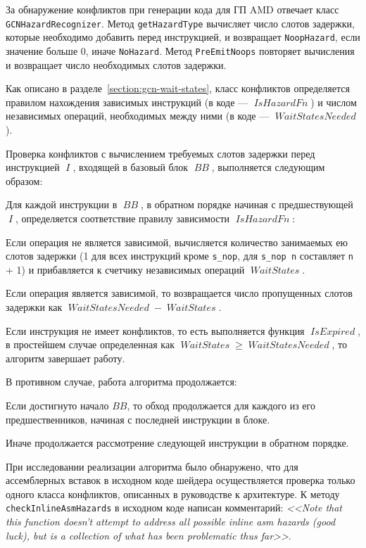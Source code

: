 \documentclass[a4paper,14pt]{extarticle}
\newcommand{\var}[1]{\mathop{\mathit{#1}}}
\begin{document}
{За обнаружение конфликтов при генерации кода для ГП AMD отвечает класс \verb|GCNHazardRecognizer|.
Метод \verb|getHazardType| вычисляет число слотов задержки, которые необходимо добавить
перед инструкцией, и возвращает \verb|NoopHazard|, если значение больше 0, иначе \verb|NoHazard|.
Метод \verb|PreEmitNoops| повторяет вычисления и возвращает число необходимых слотов задержки.

Как описано в разделе~\ref{section:gcn-wait-states}, класс конфликтов определяется
правилом нахождения зависимых инструкций (в коде — $\var{IsHazardFn}$) и числом
независимых операций, необходимых между ними (в коде — $\var{WaitStatesNeeded}$).

Проверка конфликтов с вычислением требуемых слотов задержки перед инструкцией $\var{I}$,
входящей в базовый блок $\var{BB}$, выполняется следующим образом:
\begin{ol}
\item Для каждой инструкции в $\var{BB}$, в обратном порядке начиная с предшествующей $\var{I}$,
определяется соответствие правилу зависимости $\var{IsHazardFn}$:
  \begin{ul}
  \item Если операция не является зависимой, вычисляется количество занимаемых ею слотов задержки
    (1 для всех инструкций кроме \verb|s_nop|, для \verb|s_nop n| составляет \verb|n| + 1)
    и прибавляется к счетчику независимых операций $\var{WaitStates}$.
  \item Если операция является зависимой, то возвращается число пропущенных слотов задержки
    как $\var{WaitStatesNeeded} - \var{WaitStates}$.
  \end{ul}
\item Если инструкция не имеет конфликтов, то есть выполняется функция $\var{IsExpired}$, в простейшем
  случае определенная как $\var{WaitStates} \geqslant \var{WaitStatesNeeded}$, то алгоритм завершает работу.
\item В противном случае, работа алгоритма продолжается:
  \begin{ul}
  \item Если достигнуто начало $BB$, то обход продолжается для каждого из его предшественников,
    начиная с последней инструкции в блоке.
  \item Иначе продолжается рассмотрение следующей инструкции в обратном порядке.
  \end{ul}
\end{ol}

При исследовании реализации алгоритма было обнаружено, что для ассемблерных вставок в исходном коде шейдера
осуществляется проверка только одного класса конфликтов, описанных в руководстве к архитектуре.
К методу \verb|checkInlineAsmHazards| в исходном коде написан комментарий:
\textit{<<Note that this function doesn't attempt to address all
possible inline asm hazards (good luck), but is a
collection of what has been problematic thus far>>}.

}
\end{document}
